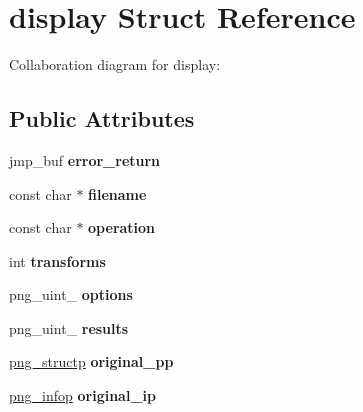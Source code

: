 \hypertarget{structdisplay}{\section{display Struct Reference}
\label{structdisplay}
}


Collaboration diagram for display\+:
\subsection*{Public Attributes}
\begin{DoxyCompactItemize}
\item 
\hypertarget{structdisplay_affbd62ae3aeb43a36700ee3629e9fcc3}{jmp\+\_\+buf {\bfseries error\+\_\+return}}\label{structdisplay_affbd62ae3aeb43a36700ee3629e9fcc3}

\item 
\hypertarget{structdisplay_a3a856c1dfd14c7344371d04f0bf7b740}{const char $\ast$ {\bfseries filename}}\label{structdisplay_a3a856c1dfd14c7344371d04f0bf7b740}

\item 
\hypertarget{structdisplay_a1b01532699ae24d8b8df1127bec25fa7}{const char $\ast$ {\bfseries operation}}\label{structdisplay_a1b01532699ae24d8b8df1127bec25fa7}

\item 
\hypertarget{structdisplay_a701c2567b88339606884fd0cb15b7010}{int {\bfseries transforms}}\label{structdisplay_a701c2567b88339606884fd0cb15b7010}

\item 
\hypertarget{structdisplay_ad0a0e345424cb10b545083ade06c3e23}{png\+\_\+uint\+\_ {\bfseries options}}\label{structdisplay_ad0a0e345424cb10b545083ade06c3e23}

\item 
\hypertarget{structdisplay_a8d9829f05768db5b70f033d35cd835ef}{png\+\_\+uint\+\_ {\bfseries results}}\label{structdisplay_a8d9829f05768db5b70f033d35cd835ef}

\item 
\hypertarget{structdisplay_aaedb92db73e6c40c488b2d14d79466e4}{\hyperlink{structpng__struct__def}{png\+\_\+structp} {\bfseries original\+\_\+pp}}\label{structdisplay_aaedb92db73e6c40c488b2d14d79466e4}

\item 
\hypertarget{structdisplay_a3c65d6e638063dfb12888e442d11d89d}{\hyperlink{structpng__info__def}{png\+\_\+infop} {\bfseries original\+\_\+ip}}\label{structdisplay_a3c65d6e638063dfb12888e442d11d89d}


\end{DoxyCompactItemize}
